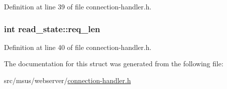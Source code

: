 Definition at line 39 of file connection-\/handler.\-h.

\hypertarget{structread__state_a5629ae045b84454938394c8af94124d1}{
\subsubsection[{req\-\_\-len}]{\setlength{\rightskip}{0pt plus 5cm}int read\-\_\-state\-::req\-\_\-len}}\label{structread__state_a5629ae045b84454938394c8af94124d1}


Definition at line 40 of file connection-\/handler.\-h.



The documentation for this struct was generated from the following file\-:\begin{DoxyCompactItemize}
\item 
src/msus/webserver/\hyperlink{connection-handler_8h}{connection-\/handler.\-h}\end{DoxyCompactItemize}
